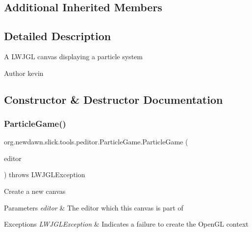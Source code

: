 \subsection*{Additional Inherited Members}


\subsection{Detailed Description}
A L\+W\+J\+GL canvas displaying a particle system

\begin{DoxyAuthor}{Author}
kevin 
\end{DoxyAuthor}


\subsection{Constructor \& Destructor Documentation}
\mbox{\label{classorg_1_1newdawn_1_1slick_1_1tools_1_1peditor_1_1_particle_game_abc250ace33dcf2289215416525d9b890}} 
\subsubsection{\texorpdfstring{Particle\+Game()}{ParticleGame()}}
{\footnotesize\ttfamily org.\+newdawn.\+slick.\+tools.\+peditor.\+Particle\+Game.\+Particle\+Game (\begin{DoxyParamCaption}\item[{\mbox{\hyperlink{classorg_1_1newdawn_1_1slick_1_1tools_1_1peditor_1_1_particle_editor}{Particle\+Editor}}}]{editor }\end{DoxyParamCaption}) throws L\+W\+J\+G\+L\+Exception\hspace{0.3cm}{\ttfamily [inline]}}

Create a new canvas


\begin{DoxyParams}{Parameters}
{\em editor} & The editor which this canvas is part of \\
\hline
\end{DoxyParams}

\begin{DoxyExceptions}{Exceptions}
{\em L\+W\+J\+G\+L\+Exception} & Indicates a failure to create the Open\+GL context \\
\hline
\end{DoxyExceptions}

